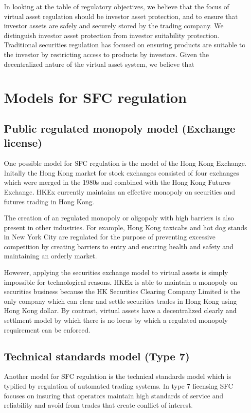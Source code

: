 In looking at the table of regulatory objectives, we believe that the
focus of virtual asset regulation should be investor asset protection,
and to ensure that investor assets are safely and securely stored by
the trading company.  We distinguish investor asset protection from
investor suitability protection.  Traditional securities regulation
has focused on ensuring products are suitable to the investor by
restricting access to products by investors.  Given the decentralized
nature of the virtual asset system, we believe that 

\section{Models for SFC regulation}

\subsection{Public regulated monopoly model (Exchange license)}
One possible model for SFC regulation is the model of the Hong Kong
Exchange.  Initally the Hong Kong market for stock exchanges consisted
of four exchanges which were merged in the 1980s and combined with the
Hong Kong Futures Exchange.  HKEx currently maintains an effective
monopoly on securities and futures trading in Hong Kong.

The creation of an regulated monopoly or oligopoly with high barriers
is also present in other industries.  For example, Hong Kong taxicabs
and hot dog stands in New York City are regulated for the purpose of
preventing excessive competition by creating barriers to entry and
ensuring health and safety and maintaining an orderly market.

However, applying the securities exchange model to virtual assets is
simply impossible for technological reasons.  HKEx is able to maintain
a monopoly on securities business because the HK Securities Clearing
Company Limited is the only company which can clear and settle
securities trades in Hong Kong using Hong Kong dollar.  By contrast,
virtual assets have a decentralized clearly and settlment model by
which there is no locus by which a regulated monopoly requirement can
be enforced.

\subsection{Technical standards model (Type 7)}

Another model for SFC regulation is the technical standards model
which is typified by regulation of automated trading systems.  In type
7 licensing SFC focuses on insuring that operators maintain high
standards of service and reliability and avoid from trades that create
conflict of interest.

